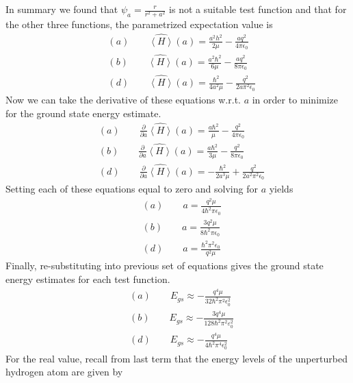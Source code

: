 \documentclass[a4paper, 11pt]{article}
\newcommand{\expectation}[1]{\ensuremath{\left\langle #1 \right\rangle}}
\newenvironment{solution}{%
	\begin{list}{}{%
			\setlength{\topsep}{0pt}%
			\setlength{\leftmargin}{0.5cm}%
			\setlength{\rightmargin}{0.5cm}%
			\setlength{\listparindent}{\parindent}%
			\setlength{\itemindent}{\parindent}%
			\setlength{\parsep}{\parskip}%
		}%
		\item[]}{\end{list}}
\begin{document}
\begin{enumerate}[leftmargin=0em, label=\textbf{\arabic*}]
\begin{solution}
      In summary we found that $\psi_a=\frac{r}{r^2+a^2}$ is not a suitable test
      function and that for the other three functions, the parametrized
      expectation value is
      \begin{align}
        &(a)\qquad \hat{\expectation{H}}(a) = \frac{a^2h^2}{2\mu}-\frac{aq^2}{4\pi\epsilon_0}\\
        &(b)\qquad \hat{\expectation{H}}(a) = \frac{a^2\hbar^2}{6\mu}-\frac{aq^2}{8\pi\epsilon_0}\\
        &(d)\qquad \hat{\expectation{H}}(a) = \frac{\hbar^2}{4a^2\mu}-\frac{q^2}{2a\pi^2\epsilon_0}
      \end{align}
      Now we can take the derivative of these equations w.r.t. $a$ in order to
      minimize for the ground state energy estimate.
      \begin{align}
        &(a)\qquad \frac{\partial}{\partial a}\hat{\expectation{H}}(a) =  \frac{a\hbar^2}{\mu} - \frac{q^2}{4\pi\epsilon_0}\\ 
        &(b)\qquad \frac{\partial}{\partial a}\hat{\expectation{H}}(a) = \frac{a\hbar^2}{3\mu}-\frac{q^2}{8\pi\epsilon_0}\\
        &(d)\qquad \frac{\partial}{\partial a}\hat{\expectation{H}}(a) = -\frac{\hbar^2}{2a^3\mu}+\frac{q^2}{2a^2\pi^2\epsilon_0}
      \end{align}
      Setting each of these equations equal to zero and solving for $a$ yields
      \begin{align}
        &(a)\qquad a = \frac{q^2\mu}{4\hbar^2\pi\epsilon_0}\\
        &(b)\qquad a = \frac{3q^2\mu}{8\hbar^2\pi\epsilon_0}\\
        &(d)\qquad a = \frac{\hbar^2\pi^2\epsilon_0}{q^2\mu}
      \end{align}
      Finally, re-substituting into previous set of equations gives the ground
      state energy estimates for each test function.
       \begin{align}
        &(a)\qquad E_{gs} \approx -\frac{q^4\mu}{32\hbar^2\pi^2\epsilon_0^2}\\
        &(b)\qquad E_{gs} \approx -\frac{3q^4\mu}{128\hbar^2\pi^2\varepsilon_0^2}\\
        &(d)\qquad E_{gs} \approx -\frac{q^4\mu}{4\hbar^2\pi^4\epsilon_0^2}
      \end{align}
      For the real value, recall from last term that the energy levels of the
      unperturbed hydrogen atom are given by
      \begin{equation}

\end{equation}
\end{solution}
\end{enumerate}
\end{document}

